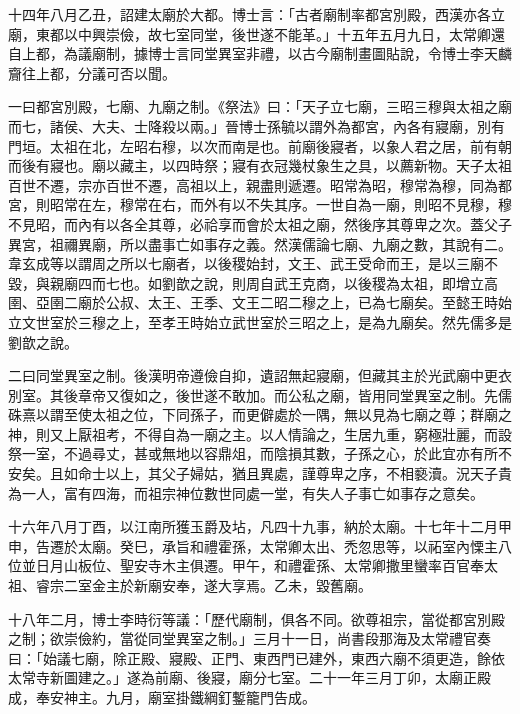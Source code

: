 \begin{pinyinscope}
 十四年八月乙丑，詔建太廟於大都。博士言：「古者廟制率都宮別殿，西漢亦各立廟，東都以中興崇儉，故七室同堂，後世遂不能革。」十五年五月九日，太常卿還自上都，為議廟制，據博士言同堂異室非禮，以古今廟制畫圖貼說，令博士李天麟齎往上都，分議可否以聞。



 一曰都宮別殿，七廟、九廟之制。《祭法》曰：「天子立七廟，三昭三穆與太祖之廟而七，諸侯、大夫、士降殺以兩。」晉博士孫毓以謂外為都宮，內各有寢廟，別有門垣。太祖在北，左昭右穆，以次而南是也。前廟後寢者，以象人君之居，前有朝而後有寢也。廟以藏主，以四時祭；寢有衣冠幾杖象生之具，以薦新物。天子太祖百世不遷，宗亦百世不遷，高祖以上，親盡則遞遷。昭常為昭，穆常為穆，同為都宮，則昭常在左，穆常在右，而外有以不失其序。一世自為一廟，則昭不見穆，穆不見昭，而內有以各全其尊，必祫享而會於太祖之廟，然後序其尊卑之次。蓋父子異宮，祖禰異廟，所以盡事亡如事存之義。然漢儒論七廟、九廟之數，其說有二。韋玄成等以謂周之所以七廟者，以後稷始封，文王、武王受命而王，是以三廟不毀，與親廟四而七也。如劉歆之說，則周自武王克商，以後稷為太祖，即增立高圉、亞圉二廟於公叔、太王、王季、文王二昭二穆之上，已為七廟矣。至懿王時始立文世室於三穆之上，至孝王時始立武世室於三昭之上，是為九廟矣。然先儒多是劉歆之說。



 二曰同堂異室之制。後漢明帝遵儉自抑，遺詔無起寢廟，但藏其主於光武廟中更衣別室。其後章帝又復如之，後世遂不敢加。而公私之廟，皆用同堂異室之制。先儒硃熹以謂至使太祖之位，下同孫子，而更僻處於一隅，無以見為七廟之尊；群廟之神，則又上厭祖考，不得自為一廟之主。以人情論之，生居九重，窮極壯麗，而設祭一室，不過尋丈，甚或無地以容鼎俎，而陰損其數，子孫之心，於此宜亦有所不安矣。且如命士以上，其父子婦姑，猶且異處，謹尊卑之序，不相褻瀆。況天子貴為一人，富有四海，而祖宗神位數世同處一堂，有失人子事亡如事存之意矣。



 十六年八月丁酉，以江南所獲玉爵及坫，凡四十九事，納於太廟。十七年十二月甲申，告遷於太廟。癸巳，承旨和禮霍孫，太常卿太出、禿忽思等，以祏室內慄主八位並日月山板位、聖安寺木主俱遷。甲午，和禮霍孫、太常卿撒里蠻率百官奉太祖、睿宗二室金主於新廟安奉，遂大享焉。乙未，毀舊廟。



 十八年二月，博士李時衍等議：「歷代廟制，俱各不同。欲尊祖宗，當從都宮別殿之制；欲崇儉約，當從同堂異室之制。」三月十一日，尚書段那海及太常禮官奏曰：「始議七廟，除正殿、寢殿、正門、東西門已建外，東西六廟不須更造，餘依太常寺新圖建之。」遂為前廟、後寢，廟分七室。二十一年三月丁卯，太廟正殿成，奉安神主。九月，廟室掛鐵綱釘鏨籠門告成。




\end{pinyinscope}
